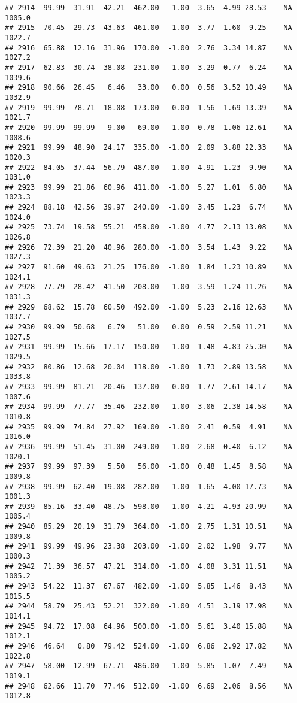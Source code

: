 \documentclass{article}\usepackage{graphicx, color}
\makeatletter
\newenvironment{kframe}{%
 \def\at@end@of@kframe{}%
 \ifinner\ifhmode%
  \def\at@end@of@kframe{\end{minipage}}%
  \begin{minipage}{\columnwidth}%
 \fi\fi%
 \def\FrameCommand##1{\hskip\@totalleftmargin \hskip-\fboxsep
 \colorbox{shadecolor}{##1}\hskip-\fboxsep
     \hskip-\linewidth \hskip-\@totalleftmargin \hskip\columnwidth}%
 \MakeFramed {\advance\hsize-\width
   \@totalleftmargin\z@ \linewidth\hsize
   \@setminipage}}%
 {\par\unskip\endMakeFramed%
 \at@end@of@kframe}
\newenvironment{knitrout}{}{} %
\makeatother
\begin{document}
\begin{knitrout}
\begin{kframe}
\begin{verbatim}
## 2914  99.99  31.91  42.21  462.00  -1.00  3.65  4.99 28.53    NA 1005.0
## 2915  70.45  29.73  43.63  461.00  -1.00  3.77  1.60  9.25    NA 1022.7
## 2916  65.88  12.16  31.96  170.00  -1.00  2.76  3.34 14.87    NA 1027.2
## 2917  62.83  30.74  38.08  231.00  -1.00  3.29  0.77  6.24    NA 1039.6
## 2918  90.66  26.45   6.46   33.00   0.00  0.56  3.52 10.49    NA 1032.9
## 2919  99.99  78.71  18.08  173.00   0.00  1.56  1.69 13.39    NA 1021.7
## 2920  99.99  99.99   9.00   69.00  -1.00  0.78  1.06 12.61    NA 1008.6
## 2921  99.99  48.90  24.17  335.00  -1.00  2.09  3.88 22.33    NA 1020.3
## 2922  84.05  37.44  56.79  487.00  -1.00  4.91  1.23  9.90    NA 1031.0
## 2923  99.99  21.86  60.96  411.00  -1.00  5.27  1.01  6.80    NA 1023.3
## 2924  88.18  42.56  39.97  240.00  -1.00  3.45  1.23  6.74    NA 1024.0
## 2925  73.74  19.58  55.21  458.00  -1.00  4.77  2.13 13.08    NA 1026.8
## 2926  72.39  21.20  40.96  280.00  -1.00  3.54  1.43  9.22    NA 1027.3
## 2927  91.60  49.63  21.25  176.00  -1.00  1.84  1.23 10.89    NA 1024.1
## 2928  77.79  28.42  41.50  208.00  -1.00  3.59  1.24 11.26    NA 1031.3
## 2929  68.62  15.78  60.50  492.00  -1.00  5.23  2.16 12.63    NA 1037.7
## 2930  99.99  50.68   6.79   51.00   0.00  0.59  2.59 11.21    NA 1027.5
## 2931  99.99  15.66  17.17  150.00  -1.00  1.48  4.83 25.30    NA 1029.5
## 2932  80.86  12.68  20.04  118.00  -1.00  1.73  2.89 13.58    NA 1033.8
## 2933  99.99  81.21  20.46  137.00   0.00  1.77  2.61 14.17    NA 1007.6
## 2934  99.99  77.77  35.46  232.00  -1.00  3.06  2.38 14.58    NA 1010.8
## 2935  99.99  74.84  27.92  169.00  -1.00  2.41  0.59  4.91    NA 1016.0
## 2936  99.99  51.45  31.00  249.00  -1.00  2.68  0.40  6.12    NA 1020.1
## 2937  99.99  97.39   5.50   56.00  -1.00  0.48  1.45  8.58    NA 1009.8
## 2938  99.99  62.40  19.08  282.00  -1.00  1.65  4.00 17.73    NA 1001.3
## 2939  85.16  33.40  48.75  598.00  -1.00  4.21  4.93 20.99    NA 1005.4
## 2940  85.29  20.19  31.79  364.00  -1.00  2.75  1.31 10.51    NA 1009.8
## 2941  99.99  49.96  23.38  203.00  -1.00  2.02  1.98  9.77    NA 1000.3
## 2942  71.39  36.57  47.21  314.00  -1.00  4.08  3.31 11.51    NA 1005.2
## 2943  54.22  11.37  67.67  482.00  -1.00  5.85  1.46  8.43    NA 1015.5
## 2944  58.79  25.43  52.21  322.00  -1.00  4.51  3.19 17.98    NA 1014.1
## 2945  94.72  17.08  64.96  500.00  -1.00  5.61  3.40 15.88    NA 1012.1
## 2946  46.64   0.80  79.42  524.00  -1.00  6.86  2.92 17.82    NA 1022.8
## 2947  58.00  12.99  67.71  486.00  -1.00  5.85  1.07  7.49    NA 1019.1
## 2948  62.66  11.70  77.46  512.00  -1.00  6.69  2.06  8.56    NA 1012.8

\end{verbatim}
\end{kframe}
\end{knitrout}
\end{document}
